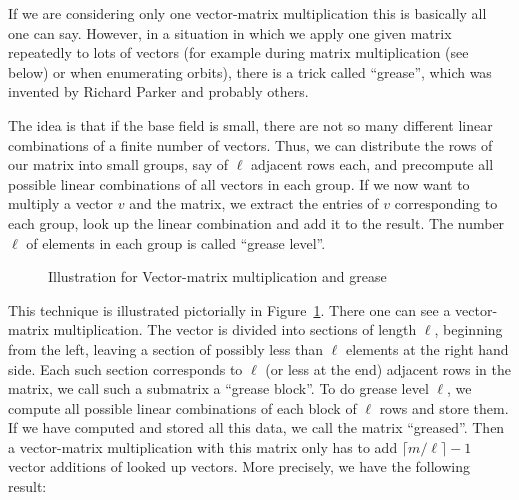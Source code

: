 If we are considering only one vector-matrix multiplication this is basically
all one can say. However, in a situation in which we apply one given
matrix repeatedly to lots of vectors (for example during matrix 
multiplication (see below) or when enumerating orbits), there is a
trick called ``grease'', which was invented by Richard Parker and 
probably others.

The idea is that if the base field is small, there are not so many
different linear combinations of a finite number of vectors. Thus,
we can distribute the rows of our matrix into small groups, say of
$\ell$ adjacent rows each, and precompute all possible linear combinations of
all vectors in each group. If we now want to multiply a vector $v$ and the 
matrix, we extract the entries of $v$ corresponding to each group,
look up the linear combination and add it to the result. The number
$\ell$ of elements in each group is called ``grease level''.

\begin{figure}[ht]
\begin{center}

\end{center}
\caption{Illustration for Vector-matrix multiplication and grease}
\label{grease}
\end{figure}

This technique is illustrated pictorially in Figure~\ref{grease}. There
one can see a vector-matrix multiplication. The vector is divided into
sections of length $\ell$, beginning from the left, leaving a section of
possibly less than $\ell$ elements at the right hand side. Each such section
corresponds to $\ell$ (or less at the end) adjacent rows in the matrix, we 
call such a submatrix a ``grease block''.
To do grease level $\ell$, we compute all possible linear combinations of
each block of $\ell$ rows and store them. If we have computed and stored
all this data, we call the matrix ``greased''.
Then a vector-matrix multiplication
with this matrix only has to add $\lceil m/\ell \rceil -1$ vector additions
of looked up vectors. More precisely, we have the following result:

